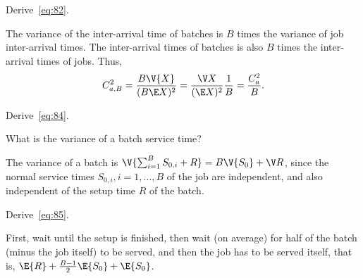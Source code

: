 \begin{extra}
Derive~\cref{eq:82}.
\begin{solution}
The variance of the inter-arrival time of batches is $B$ times the variance of job inter-arrival times. The inter-arrival times of batches is also $B$ times the inter-arrival times of jobs. Thus, 
\begin{equation*}
  C_{a,B}^2 = \frac{B \V{X}}{(B \E X)^2} = \frac{\V X}{(\E X)^2} \frac 1 B =  \frac{C_a^2}{B}.
\end{equation*}
\end{solution}
\end{extra}


\begin{extra}
Derive~\cref{eq:84}.
\begin{hint}
  What is the variance of a batch service time?
\end{hint}
\begin{solution}
  The variance of a batch is $\V{\sum_{i=1}^B S_{0,i} + R} = B\V{S_0} + \V R$, since the normal service times $S_{0,i}, i=1,\ldots, B$ of the job are independent, and also independent of the setup time $R$ of the batch.
\end{solution}
\end{extra}



\begin{extra}
 Derive~\cref{eq:85}.
\begin{solution}
  First, wait until the setup is finished,  then wait (on average) for half of the batch (minus the job itself) to be served, and then the job has to be served itself, that is,
$\E{R}  + \frac{B-1}{2}\E{S_0} +\E{S_0}$.
\end{solution}
\end{extra}




